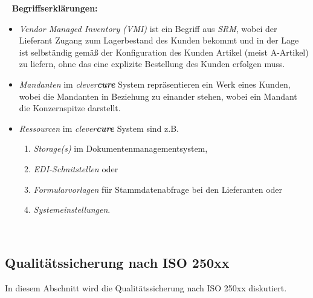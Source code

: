 \egroup
\ \newline 
\newline
\textbf{Begriffserklärungen:}
\begin{itemize}
	\item \emph{Vendor Managed Inventory (VMI)} ist ein Begriff aus \emph{SRM}, wobei der Lieferant Zugang zum Lagerbestand des Kunden bekommt und in der Lage ist selbständig gemäß der Konfiguration des Kunden Artikel (meist A-Artikel) zu liefern, ohne das eine explizite Bestellung des Kunden erfolgen muss.
	\item\emph{Mandanten} im \emph{clever\textbf{cure}} System repräsentieren ein Werk eines Kunden, wobei die Mandanten in Beziehung zu einander stehen, wobei ein Mandant die Konzernspitze darstellt.
	\item\emph{Ressourcen} im \emph{clever\textbf{cure}} System sind z.B.
	\begin{enumerate}
		\item\emph{Storage(s)} im Dokumentenmanagementsystem,
		\item\emph{EDI-Schnitstellen} oder
		\item\emph{Formularvorlagen} für Stammdatenabfrage bei den Lieferanten oder
		\item\emph{Systemeinstellungen}.
	\end{enumerate}
\end{itemize}
\ \newpage
\subsection{Qualitätssicherung nach ISO 250xx}
\label{sec:qualtity-quality-ensurement}
In diesem Abschnitt wird die Qualitätssicherung nach ISO 250xx diskutiert.
